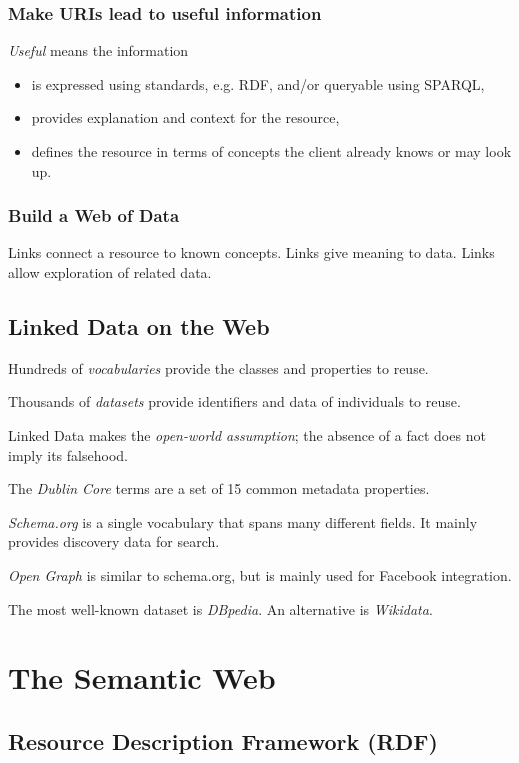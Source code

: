 \documentclass{report}
\begin{document}
\subsubsection{Make URIs lead to useful information}

\emph{Useful} means the information
\begin{itemize}
  \item is expressed using standards, e.g. RDF,
        and/or queryable using SPARQL,
  \item provides explanation and context for the resource,
  \item defines the resource in terms of concepts
        the client already knows or may look up.
\end{itemize}

\subsubsection{Build a Web of Data}

Links connect a resource to known concepts.
Links give meaning to data.
Links allow exploration of related data.

\subsection{Linked Data on the Web}

Hundreds of \emph{vocabularies} provide
the classes and properties to reuse.

Thousands of \emph{datasets} provide
identifiers and data of individuals to reuse.

Linked Data makes the \emph{open-world assumption};
the absence of a fact does not imply its falsehood.

The \emph{Dublin Core} terms are
a set of 15 common metadata properties.

\emph{Schema.org} is a single vocabulary
that spans many different fields.
It mainly provides discovery data for search.

\emph{Open Graph} is similar to schema.org,
but is mainly used for Facebook integration.

The most well-known dataset is \emph{DBpedia}.
An alternative is \emph{Wikidata}.

\section{The Semantic Web}

\subsection{Resource Description Framework (RDF)}
\end{document}
